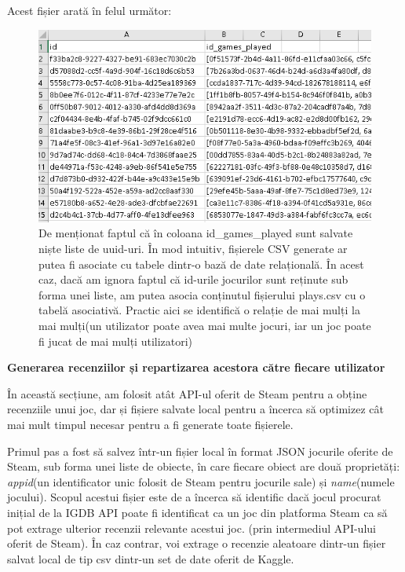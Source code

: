 \documentclass[12pt,a4paper]{report}
\begin{document}
Acest fișier arată în felul următor:

\begin{figure}[H]
\centering
\caption{}
\includegraphics[scale = 0.8]{exemplu_12_plays}
\caption*{De menționat faptul că în coloana id\_games\_played sunt salvate niște liste de uuid-uri. În mod intuitiv, fișierele CSV generate ar putea fi asociate cu tabele dintr-o bază de date relațională. În acest caz, dacă am ignora faptul că id-urile jocurilor sunt reținute sub forma unei liste, am putea asocia conținutul fișierului plays.csv cu o tabelă asociativă. Practic aici se identifică o relație de mai mulți la mai mulți(un utilizator poate avea mai multe jocuri, iar un joc poate fi jucat de mai mulți utilizatori) }
\end{figure}

\bigskip
\textbf{Generarea recenziilor și repartizarea acestora către fiecare utilizator}
\bigskip

În această secțiune, am folosit atât API-ul oferit de Steam pentru a obține recenziile unui joc, dar și fișiere salvate local pentru a încerca să optimizez cât mai mult timpul necesar pentru a fi generate toate fișierele.

Primul pas a fost să salvez într-un fișier local în format JSON jocurile oferite de Steam, sub forma unei liste de obiecte, în care fiecare obiect are două proprietăți:  \emph{appid}(un identificator unic folosit de Steam pentru jocurile sale) și \emph{name}(numele jocului). Scopul acestui fișier este de a încerca să identific dacă jocul procurat inițial de la IGDB API poate fi identificat ca un joc din platforma Steam ca să pot extrage ulterior recenzii relevante acestui joc. (prin intermediul API-ului oferit de Steam). În caz contrar, voi extrage o recenzie aleatoare dintr-un fișier salvat local de tip csv dintr-un set de date oferit de Kaggle. \cite{17}
\end{document}
